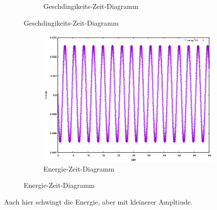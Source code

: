 \documentclass[
    oneside,
    ngerman,
    footinclude=false,
    captions=tableheading,
    DIV=12
]{scrartcl}
\begin{document}
\begin{figure}[H]
\begin{subfigure}[b]{0.45\textwidth}
                        \caption{Geschdingikeits-Zeit-Diagramm}
                        \label{fig:expEulerA1(a)-001-0-v}
                    \end{subfigure}
                \end{figure}
                
                \begin{figure}[H]
                \centering
                \begin{subfigure}[b]{0.45\textwidth}
                    \centering
                    \includegraphics[width=\textwidth]{Bilddateien/expEulerA1(a)-001h-E.png}
                    \caption{Energie-Zeit-Diagramm}
                    \label{fig:expEulerA1(a)-001-0-E}
                \end{subfigure}
                \end{figure}
                Auch hier schwingt die Energie, aber mit kleinerer Ampltiude.
\end{document}
